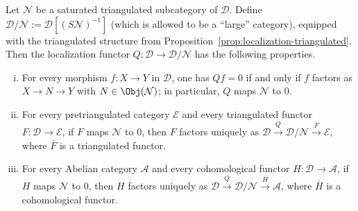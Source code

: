 \begin{theorem}\label{prop:Verdier-localization}
	Let $\mathcal{N}$ be a saturated triangulated subcategory of
	$\mathcal{D}$. Define
	$\mathcal{D}/\mathcal{N} := \mathcal{D}\left[ (S\mathcal{N})^{-1}\right]$
	(which is allowed to be a “large” category), equipped with the
	triangulated structure from
	Proposition~\ref{prop:localization-triangulated}. Then the localization
	functor $Q: \mathcal{D} \to \mathcal{D}/\mathcal{N}$ has the following
	properties.
	\begin{enumerate}[(i)]
		\item For every morphism $f: X \to Y$ in $\mathcal{D}$, one has
		$Qf = 0$ if and only if $f$ factors as $X \to N \to Y$ with
		$N \in \Obj(\mathcal{N})$; in particular, $Q$ maps $\mathcal{N}$
		to $0$.
		\item For every pretriangulated category $\mathcal{E}$ and every
		triangulated functor $F: \mathcal{D} \to \mathcal{E}$, if $F$ maps
		$\mathcal{N}$ to $0$, then $F$ factors uniquely as
		$\mathcal{D} \xrightarrow{Q} \mathcal{D}/\mathcal{N}
		\xrightarrow{\overline{F}} \mathcal{E}$, where $\overline{F}$ is a
		triangulated functor.
		\item For every Abelian category $\mathcal{A}$ and every
		cohomological functor $H: \mathcal{D} \to \mathcal{A}$, if $H$ maps
		$\mathcal{N}$ to $0$, then $H$ factors uniquely as
		$\mathcal{D} \xrightarrow{Q} \mathcal{D}/\mathcal{N}
		\xrightarrow{\overline{H}} \mathcal{A}$, where $\overline{H}$ is a
		cohomological functor.
	\end{enumerate}
\end{theorem}


